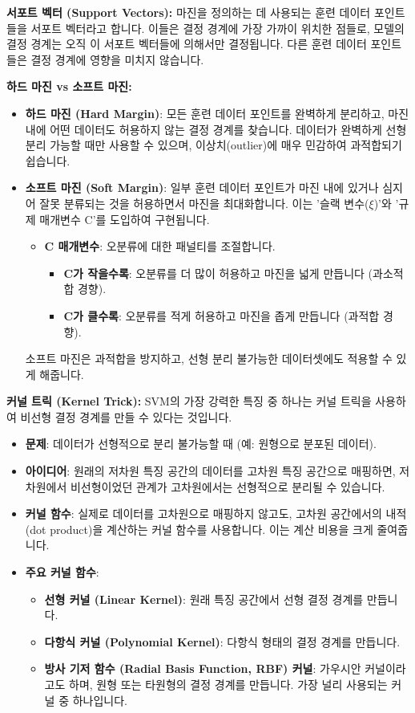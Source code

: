 \documentclass[11pt,a4paper]{article}
\theoremstyle{definition}
\begin{document}
\textbf{서포트 벡터 (Support Vectors):}
마진을 정의하는 데 사용되는 훈련 데이터 포인트들을 서포트 벡터라고 합니다. 이들은 결정 경계에 가장 가까이 위치한 점들로, 모델의 결정 경계는 오직 이 서포트 벡터들에 의해서만 결정됩니다. 다른 훈련 데이터 포인트들은 결정 경계에 영향을 미치지 않습니다.

\textbf{하드 마진 vs 소프트 마진:}
\begin{itemize}
    \item \textbf{하드 마진 (Hard Margin)}: 모든 훈련 데이터 포인트를 완벽하게 분리하고, 마진 내에 어떤 데이터도 허용하지 않는 결정 경계를 찾습니다. 데이터가 완벽하게 선형 분리 가능할 때만 사용할 수 있으며, 이상치(outlier)에 매우 민감하여 과적합되기 쉽습니다.
    \item \textbf{소프트 마진 (Soft Margin)}: 일부 훈련 데이터 포인트가 마진 내에 있거나 심지어 잘못 분류되는 것을 허용하면서 마진을 최대화합니다. 이는 '슬랙 변수($\xi$)'와 '규제 매개변수 C'를 도입하여 구현됩니다.
        \begin{itemize}
            \item \textbf{C 매개변수}: 오분류에 대한 패널티를 조절합니다.
            \begin{itemize}
                \item \textbf{C가 작을수록}: 오분류를 더 많이 허용하고 마진을 넓게 만듭니다 (과소적합 경향).
                \item \textbf{C가 클수록}: 오분류를 적게 허용하고 마진을 좁게 만듭니다 (과적합 경향).
            \end{itemize}
        \end{itemize}
    소프트 마진은 과적합을 방지하고, 선형 분리 불가능한 데이터셋에도 적용할 수 있게 해줍니다.
\end{itemize}

\textbf{커널 트릭 (Kernel Trick):}
SVM의 가장 강력한 특징 중 하나는 커널 트릭을 사용하여 비선형 결정 경계를 만들 수 있다는 것입니다.
\begin{itemize}
    \item \textbf{문제}: 데이터가 선형적으로 분리 불가능할 때 (예: 원형으로 분포된 데이터).
    \item \textbf{아이디어}: 원래의 저차원 특징 공간의 데이터를 고차원 특징 공간으로 매핑하면, 저차원에서 비선형이었던 관계가 고차원에서는 선형적으로 분리될 수 있습니다.
    \item \textbf{커널 함수}: 실제로 데이터를 고차원으로 매핑하지 않고도, 고차원 공간에서의 내적(dot product)을 계산하는 커널 함수를 사용합니다. 이는 계산 비용을 크게 줄여줍니다.
    \item \textbf{주요 커널 함수}:
        \begin{itemize}
            \item \textbf{선형 커널 (Linear Kernel)}: 원래 특징 공간에서 선형 결정 경계를 만듭니다.
            \item \textbf{다항식 커널 (Polynomial Kernel)}: 다항식 형태의 결정 경계를 만듭니다.
            \item \textbf{방사 기저 함수 (Radial Basis Function, RBF) 커널}: 가우시안 커널이라고도 하며, 원형 또는 타원형의 결정 경계를 만듭니다. 가장 널리 사용되는 커널 중 하나입니다.
        \end{itemize}
\end{itemize}
\end{document}
